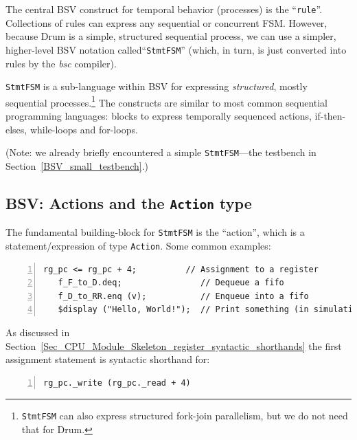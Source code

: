 \label{Sec_FSMs_StmtFSM}


The central BSV construct for temporal behavior (processes) is the
``\verb|rule|''.  Collections of rules can express any sequential or
concurrent FSM.  However, because Drum is a simple, structured
sequential process, we can use a simpler, higher-level BSV notation
called``\verb|StmtFSM|'' (which, in turn, is just converted into rules
by the \emph{bsc} compiler).

\verb|StmtFSM| is a sub-language within BSV for expressing
\emph{structured}, mostly sequential processes.\footnote{{\tt StmtFSM}
can also express structured fork-join parallelism, but we do not need
that for Drum.}  The constructs are similar to most common
sequential programming languages: blocks to express temporally
sequenced actions, if-then-elses, while-loops and for-loops.

(Note: we already briefly encountered a simple \verb|StmtFSM|---the
testbench in Section~\ref{BSV_small_testbench}.)


\subsection{BSV: Actions and the {\tt Action} type}


The fundamental building-block for \verb|StmtFSM| is the ``action'',
which is a statement/expression of type \verb|Action|.  Some common
examples:

\begin{Verbatim}[frame=single, numbers=left]
   rg_pc <= rg_pc + 4;          // Assignment to a register
   f_F_to_D.deq;                // Dequeue a fifo
   f_D_to_RR.enq (v);           // Enqueue into a fifo
   $display ("Hello, World!");  // Print something (in simulation only)
\end{Verbatim}

As discussed in
Section~\ref{Sec_CPU_Module_Skeleton_register_syntactic_shorthands}
the first assignment statement is syntactic shorthand for:

\begin{Verbatim}[frame=single, numbers=left]
   rg_pc._write (rg_pc._read + 4)
\end{Verbatim}

